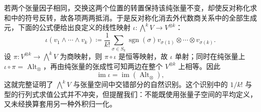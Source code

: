 \ProseParagraphBreak

若两个张量因子相同，交换这两个位置的转置保持该纯张量不变，却使反对称化求和中的符号反转，故各项两两抵消。于是反对称化消去外代数商关系中的全部生成元，下面的公式便给出良定义的线性映射
\(\iota:\bigwedge^kV\rightarrow V^{\otimes k}\)：
\[
 \iota(v_1\wedge\cdots\wedge v_k)
 \coloneqq
 \frac1{k!}\sum_{\sigma\in S_k}
   \operatorname{sgn}(\sigma)
   v_{\sigma(1)}\otimes\cdots\otimes v_{\sigma(k)}.
\]
设 \(\pi:V^{\otimes k}\rightarrow\bigwedge^kV\) 为商映射，则
\(\pi\circ\iota\) 是恒等映射，故 \(\iota\) 单射；同时在纯张量上
\(\iota\circ\pi=\operatorname{Alt}_{\otimes}\)，再由纯张量的张成性可知两边在整个
\(V^{\otimes k}\) 上相等。因此
\[
 \operatorname{im}\iota
 =\operatorname{im}(\operatorname{Alt}_{\otimes}),
\]
这就完整证明了 \(\bigwedge^kV\) 与张量空间中交错部分的自然识别。这个识别中的 \(1/k!\) 与型的行列式求值公式并不冲突，但提醒我们：不能既使用张量子空间的平均定义，又未经换算套用另一种外积归一化。
